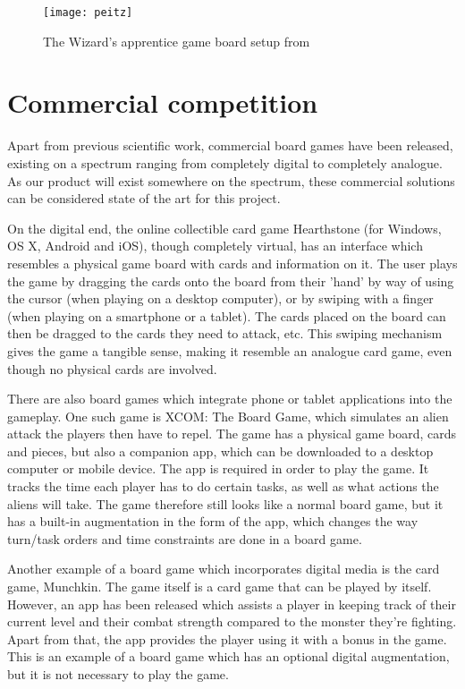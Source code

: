 \begin{figure}[!h]
\centering	
\texttt{[image: peitz]}
\caption{The Wizard's apprentice game board setup from \citep{peitzWizards2006}}
\label{fig:peitz}
\end{figure}

\section{Commercial competition}
Apart from previous scientific work, commercial board games have been released, existing on a spectrum ranging from completely digital to completely analogue. As our product will exist somewhere on the spectrum, these commercial solutions can be considered state of the art for this project.

On the digital end, the online collectible card game Hearthstone (for Windows, OS X, Android and iOS), though completely virtual, has an interface which resembles a physical game board with cards and information on it. The user plays the game by dragging the cards onto the board from their 'hand' by way of using the cursor (when playing on a desktop computer), or by swiping with a finger (when playing on a smartphone or a tablet). The cards placed on the board can then be dragged to the cards they need to attack, etc. This swiping mechanism gives the game a tangible sense, making it resemble an analogue card game, even though no physical cards are involved.

There are also board games which integrate phone or tablet applications into the gameplay. One such game is XCOM: The Board Game, which simulates an alien attack the players then have to repel. The game has a physical game board, cards and pieces, but also a companion app, which can be downloaded to a desktop computer or mobile device. The app is required in order to play the game. It tracks the time each player has to do certain tasks, as well as what actions the aliens will take. The game therefore still looks like a normal board game, but it has a built-in augmentation in the form of the app, which changes the way turn/task orders and time constraints are done in a board game.

Another example of a board game which incorporates digital media is the card game, Munchkin. The game itself is a card game that can be played by itself. However, an app has been released which assists a player in keeping track of their current level and their combat strength compared to the monster they're fighting. Apart from that, the app provides the player using it with a bonus in the game. This is an example of a board game which has an optional digital augmentation, but it is not necessary to play the game.

